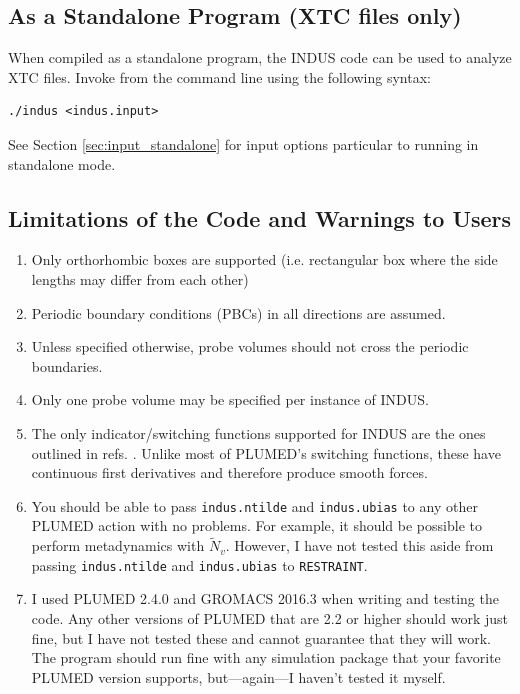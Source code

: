 \documentclass[11pt,notitlepage]{article}
\begin{document}

\subsection{As a Standalone Program (XTC files only)}

When compiled as a standalone program, the INDUS code can be used to analyze XTC files. Invoke from the command line using the following syntax:

\begin{lstlisting}
./indus <indus.input>
\end{lstlisting}

See Section \ref{sec:input_standalone} for input options particular to running in standalone mode.


\subsection{Limitations of the Code and Warnings to Users}

\begin{enumerate}
	\item Only orthorhombic boxes are supported (i.e. rectangular box where the side lengths may differ from each other)
	
	\item Periodic boundary conditions (PBCs) in all directions are assumed.
	
	\item Unless specified otherwise, probe volumes should not cross the periodic boundaries.
	
	\item Only one probe volume may be specified per instance of INDUS.
	
	\item The only indicator/switching functions supported for INDUS are the ones outlined in refs. \cite{Patel2010,Patel2011}. Unlike most of PLUMED's switching functions, these have continuous first derivatives and therefore produce smooth forces.
	
	\item You should be able to pass \texttt{indus.ntilde} and \texttt{indus.ubias} to any other PLUMED action with no problems. For example, it should be possible to perform metadynamics with $\tilde{N}_v$. However, I have not tested this aside from passing \texttt{indus.ntilde} and \texttt{indus.ubias} to \texttt{RESTRAINT}.
	
	\item I used PLUMED 2.4.0 and GROMACS 2016.3 when writing and testing the code. Any other versions of PLUMED that are 2.2 or higher should work just fine, but I have not tested these and cannot guarantee that they will work. The program should run fine with any simulation package that your favorite PLUMED version supports, but---again---I haven't tested it myself.
\end{enumerate}
\end{document}
